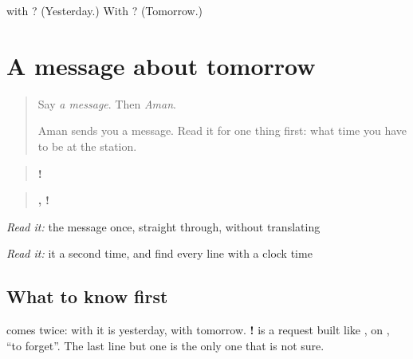 \begin{tcolorbox}[breakable,colback=teal!4,colframe=teal!35!black,title={Before you move on}]
\textbf{} with \textbf{}? (Yesterday.) With \textbf{}? (Tomorrow.)
\end{tcolorbox}
\section[(reading)]{A message about tomorrow}

\label{lesson:PA-C224-message}



\begin{quote}
Say \emph{a message}. Then \emph{Aman}.

Aman sends you a message. Read it for one thing first: what time you have to be at the station.
\end{quote}

\begin{tcolorbox}[breakable,skin=enhanced,colback=orange!6,colframe=orange!45!black,boxrule=0.5pt,arc=1mm,left=6pt,right=6pt,top=4pt,bottom=4pt,fonttitle=\bfseries,title={Read this}]
\begin{quote}
\textbf{   !}
\end{quote}

\begin{quote}
\textbf{  } \textbf{   } \textbf{   ,     } \textbf{     } \textbf{   } \textbf{    } \textbf{  !} \textbf{   } \textbf{ }
\end{quote}

\emph{Read it:} the message once, straight through, without translating

\emph{Read it:} it a second time, and find every line with a clock time
\end{tcolorbox}

\subsection*{What to know first}
\textbf{} comes twice: with \textbf{} it is yesterday, with \textbf{} tomorrow. \textbf{  !} is a request built like \textbf{ }, on \textbf{}, \textquotedblleft{}to forget\textquotedblright{}. The last line but one is the only one that is not sure.

